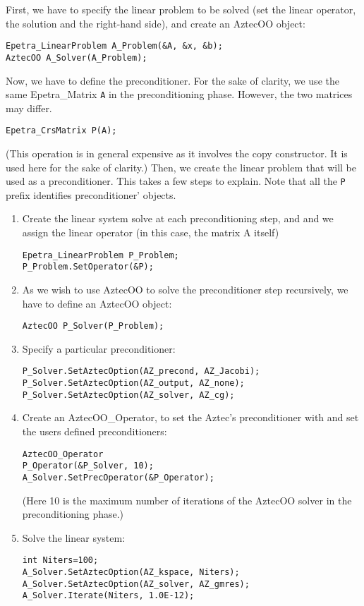 First, we have to specify the linear problem to be solved (set the
linear operator, the solution and the right-hand side), and create an
AztecOO object:
\begin{verbatim}
Epetra_LinearProblem A_Problem(&A, &x, &b);
AztecOO A_Solver(A_Problem);
\end{verbatim}
Now, we have to define the preconditioner. For the sake of clarity,
we use the same Epetra\_Matrix \verb!A! in the
preconditioning phase. However, the two matrices may differ.
\begin{verbatim}
Epetra_CrsMatrix P(A);
\end{verbatim}
(This operation is in general expensive as it involves the copy
constructor. It is used here for the sake of clarity.)  Then, we
create the linear problem that will be used as a preconditioner.  This
takes a few steps to explain.  Note that all the \verb!P! prefix identifies
preconditioner' objects.
\begin{enumerate}
\item Create the linear system solve at each preconditioning step, and and we
  assign the linear operator (in this case, the matrix A itself)
\begin{verbatim}
Epetra_LinearProblem P_Problem;
P_Problem.SetOperator(&P);
\end{verbatim}
\item As we wish to use AztecOO to solve the preconditioner step recursively, 
we have to define an AztecOO object:
\begin{verbatim}
AztecOO P_Solver(P_Problem);  
\end{verbatim}
\item Specify a particular preconditioner:
\begin{verbatim}
P_Solver.SetAztecOption(AZ_precond, AZ_Jacobi);
P_Solver.SetAztecOption(AZ_output, AZ_none);
P_Solver.SetAztecOption(AZ_solver, AZ_cg);
\end{verbatim}
\item Create an AztecOO\_Operator, to set
  the Aztec's preconditioner with and set the users defined preconditioners:
\begin{verbatim}
AztecOO_Operator
P_Operator(&P_Solver, 10);  
A_Solver.SetPrecOperator(&P_Operator);
\end{verbatim}
(Here 10 is the maximum number of iterations of the AztecOO solver in
the preconditioning phase.)
\item Solve the linear system:
\begin{verbatim}
int Niters=100;
A_Solver.SetAztecOption(AZ_kspace, Niters);
A_Solver.SetAztecOption(AZ_solver, AZ_gmres);
A_Solver.Iterate(Niters, 1.0E-12);  
\end{verbatim}
\end{enumerate}


